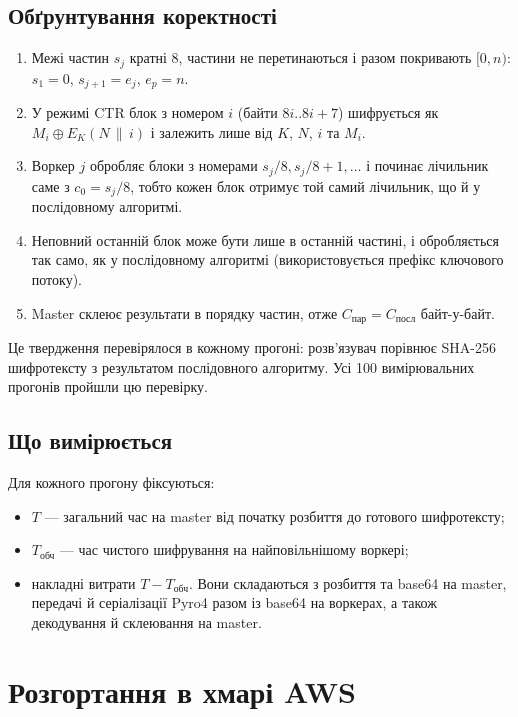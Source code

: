 \documentclass[a4paper,12pt]{article}
\begin{document}
\subsection{Обґрунтування коректності}
\begin{enumerate}
  \item Межі частин $s_j$ кратні 8, частини не перетинаються і разом покривають
        $[0, n)$: $s_1 = 0$, $s_{j+1} = e_j$, $e_p = n$.
  \item У режимі CTR блок з номером $i$ (байти $8i..8i+7$) шифрується як
        $M_i \oplus E_K(N \,\|\, i)$ і залежить лише від $K$, $N$, $i$ та $M_i$.
  \item Воркер $j$ обробляє блоки з номерами $s_j/8, s_j/8 + 1, \dots$ і починає
        лічильник саме з $c_0 = s_j/8$, тобто кожен блок отримує той самий
        лічильник, що й у послідовному алгоритмі.
  \item Неповний останній блок може бути лише в останній частині, і обробляється
        так само, як у послідовному алгоритмі (використовується префікс ключового потоку).
  \item Master склеює результати в порядку частин, отже $C_{\text{пар}} = C_{\text{посл}}$
        байт-у-байт.
\end{enumerate}
Це твердження перевірялося в кожному прогоні: розв'язувач порівнює SHA-256
шифротексту з результатом послідовного алгоритму. Усі 100 вимірювальних прогонів
пройшли цю перевірку.

\subsection{Що вимірюється}
Для кожного прогону фіксуються:
\begin{itemize}
  \item $T$ --- загальний час на master від початку розбиття до готового шифротексту;
  \item $T_{\text{обч}}$ --- час чистого шифрування на найповільнішому воркері;
  \item накладні витрати $T - T_{\text{обч}}$. Вони складаються з розбиття та base64 на master,
        передачі й серіалізації Pyro4 разом із base64 на воркерах, а також декодування й склеювання на master.
\end{itemize}

\section{Розгортання в хмарі AWS}
\end{document}
